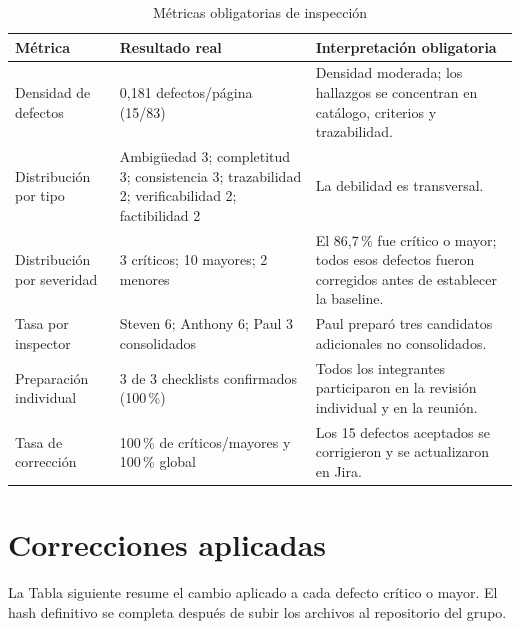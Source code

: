 \documentclass[11pt,a4paper]{article}
\begin{document}
	\begin{table}[H]
		\centering
		\caption{Métricas obligatorias de inspección}
		\begin{tabularx}{\textwidth}{p{4.1cm}p{3.2cm}X}
			\toprule
			\textbf{Métrica} & \textbf{Resultado real} & \textbf{Interpretación obligatoria}\\
			\midrule
			Densidad de defectos & 0,181 defectos/página (15/83) & Densidad moderada; los hallazgos se concentran en catálogo, criterios y trazabilidad.\\
			Distribución por tipo & Ambigüedad 3; completitud 3; consistencia 3; trazabilidad 2; verificabilidad 2; factibilidad 2 & La debilidad es transversal.\\
			Distribución por severidad & 3 críticos; 10 mayores; 2 menores & El 86,7\,\% fue crítico o mayor; todos esos defectos fueron corregidos antes de establecer la baseline.\\
			Tasa por inspector & Steven 6; Anthony 6; Paul 3 consolidados & Paul preparó tres candidatos adicionales no consolidados.\\
			Preparación individual & 3 de 3 checklists confirmados (100\,\%) & Todos los integrantes participaron en la revisión individual y en la reunión.\\
			Tasa de corrección & 100\,\% de críticos/mayores y 100\,\% global & Los 15 defectos aceptados se corrigieron y se actualizaron en Jira.\\
			\bottomrule
		\end{tabularx}
	\end{table}
	
	\section{Correcciones aplicadas}
	La Tabla siguiente resume el cambio aplicado a cada defecto crítico o mayor. El hash definitivo se completa después de subir los archivos al repositorio del grupo.
	
\end{document}
